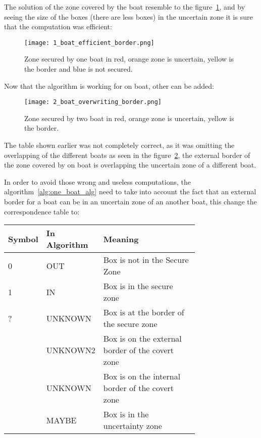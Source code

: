 The solution of the zone covered by the boat resemble to the figure~\ref{fig:SecureZoneMAYBEOneBoat}, and by seeing the size of the boxes (there are less boxes) in the uncertain zone it is sure that the computation was efficient:

\begin{figure}[H]
\centering
    \texttt{[image: 1\_boat\_efficient\_border.png]}
    \caption{Zone secured by one boat in red, orange zone is uncertain, yellow is the border and blue is not secured.}
    \label{fig:SecureZoneMAYBEOneBoat}
\end{figure}

Now that the algorithm is working for on boat, other can be added:

\begin{figure}[H]
\centering
    \texttt{[image: 2\_boat\_overwriting\_border.png]}
    \caption{Zone secured by two boat in red, orange zone is uncertain, yellow is the border.}
    \label{fig:SecureZoneTwoBoat}
\end{figure}


The table shown earlier was not completely correct, as it was omitting the overlapping of the different boats as seen in the figure~\ref{fig:SecureZoneTwoBoat}, the external border of the zone covered by on boat is overlapping the uncertain zone of a different boat.\newline

In order to avoid those wrong and useless computations, the algorithm~\ref{alg:one_boat_alg} need to take into account the fact that an external border for a boat can be in an uncertain zone of an another boat, this change the correspondence table to:

\begin{center}
\begin{tabular}{|m{0.10\linewidth}|m{0.15\linewidth}|m{0.5\linewidth}|}
\hline
 Symbol & In Algorithm  & Meaning  \\ \hline
 0 & OUT & Box is not in the Secure Zone  \\ \hline
 1 & IN & Box is in the secure zone \\ \hline
 ? & UNKNOWN & Box is at the border of the secure zone  \\ \hline
[0,?]& UNKNOWN2  & Box is on the external border of the covert zone \\ \hline
[?,1]& UNKNOWN  & Box is on the internal border of the covert zone\\ \hline
[0,1]& MAYBE  & Box is in the uncertainty zone\\ \hline
   
\end{tabular}
\end{center}

